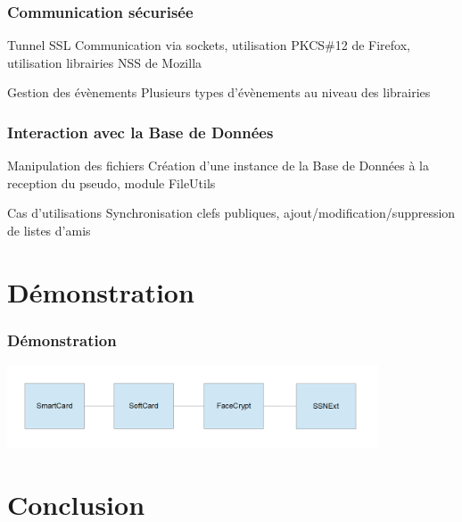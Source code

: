 \documentclass{beamer}
\begin{document}
\begin{frame}
    \frametitle{Communication sécurisée}
    \begin{block}{Tunnel SSL}
    Communication via sockets, utilisation PKCS\#12 de Firefox,
    utilisation librairies NSS de Mozilla
    \end{block}
    \begin{block}{Gestion des évènements}
    Plusieurs types d'évènements au niveau des librairies
    \end{block}
\end{frame}

\begin{frame}
    \frametitle{Interaction avec la Base de Données}
    \begin{block}{Manipulation des fichiers}
    Création d'une instance de la Base de Données à la reception du pseudo,
    module FileUtils
    \end{block}
    \begin{block}{Cas d'utilisations}
    Synchronisation clefs publiques, ajout/modification/suppression
    de listes d'amis
    \end{block}
\end{frame}

\section{Démonstration}
\begin{frame}
    \frametitle{Démonstration}
    \begin{center}
    \includegraphics[width=11cm]{all.png}
    \end{center}
\end{frame}

\section{Conclusion}
\end{document}
